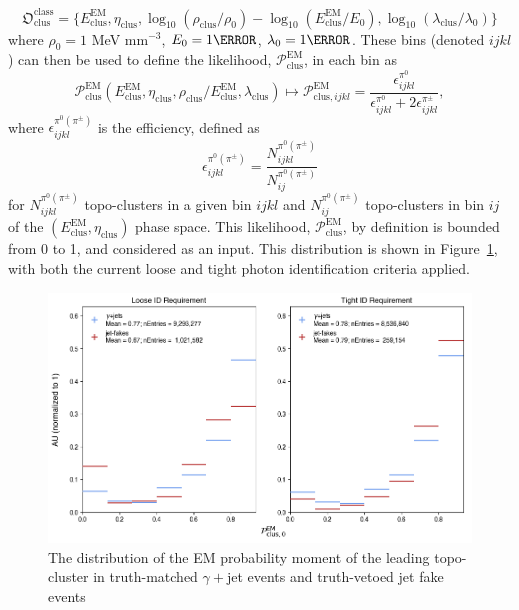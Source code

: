 \begin{equation}
    \mathfrak{O}_{\text{clus}}^{\text{class}} = \{
        E_{\text{clus}}^{\text{EM}},
        \eta_{\text{clus}},
        \log_{10}(\rho_{\text{clus}} / \rho_{\text{0}}) - \log_{10}(E_{\text{clus}}^{\text{EM}} / E_{\text{0}}),
        \log_{10}(\lambda_{\text{clus}} / \lambda_{\text{0}})
    \}
\end{equation}
where $\rho_0 = 1$ MeV mm$^{-3}$, $E_0 = \unit{1}{\MeV}$, $\lambda_{0} = \unit{1}{\mm}$. These bins (denoted $ijkl$) can then be used to define the likelihood, $ \mathcal{P}_{\text{clus}}^{\text{EM}}$, in each bin as
\begin{equation}
    \mathcal{P}_{\text{clus}}^{\text{EM}} ( E_{\text{clus}}^{\text{EM}}, \eta_{\text{clus}}, \rho_{\text{clus}} / E_{\text{clus}}^{\text{EM}}, \lambda_{\text{clus}}) \mapsto \mathcal{P}_{\text{clus}, ijkl}^{\text{EM}}  = \frac{\epsilon^{\pi^0}_{ijkl}}{ \epsilon^{\pi^0}_{ijkl} + 2\epsilon^{\pi^\pm}_{ijkl}},
\end{equation}
where $\epsilon^{\pi^0(\pi^\pm)}_{ijkl}$ is the efficiency, defined as
\begin{equation}
    \epsilon^{\pi^0(\pi^\pm)}_{ijkl} = \frac{ N^{\pi^0(\pi^\pm)}_{ijkl} }{N^{\pi^0(\pi^\pm)}_{ij}}
\end{equation}
for $N^{\pi^0(\pi^\pm)}_{ijkl}$ topo-clusters in a given bin $ijkl$ and $N^{\pi^0(\pi^\pm)}_{ij}$ topo-clusters in bin $ij$ of the $(E_{\text{clus}}^{\text{EM}}, \eta_{\text{clus}})$ phase space. This likelihood, $\mathcal{P}_{\text{clus}}^{\text{EM}}$, by definition is bounded from 0 to 1, and considered as an input. This distribution is shown in Figure~\ref{fig:topo-emProb}, with both the current loose and tight photon identification criteria applied.

\begin{figure}[htb]
    \centering 
    \includegraphics[width=\textwidth]{chapters/chapter4_photonID/images/hists/y_topoCluster0_emProbability.png}
    \caption[The distribution of the \gls{EM} probability moment of the leading topo-cluster]{The distribution of the \gls{EM} probability moment of the leading topo-cluster in truth-matched $\gamma+$jet events and truth-vetoed jet fake events}
    \label{fig:topo-emProb}
\end{figure}


